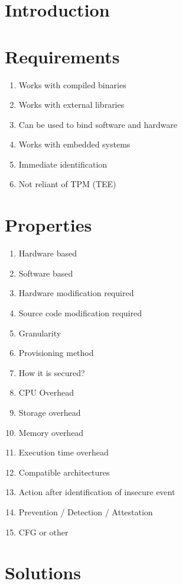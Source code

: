 \section{Introduction}\label{requirementsIntro}


\section{Requirements}\label{Requirements}

\begin{enumerate}
	\item Works with compiled binaries
	\item Works with external libraries
	\item Can be used to bind software and hardware
	\item Works with embedded systems
	\item Immediate identification
	\item Not reliant of TPM (TEE)
\end{enumerate}

\section{Properties}\label{Properties}

\begin{enumerate}
	\item Hardware based
	\item Software based
	\item Hardware modification required
	\item Source code modification required
	\item Granularity
	\item Provisioning method
	\item How it is secured?
	\item CPU Overhead
	\item Storage overhead
	\item Memory overhead
	\item Execution time overhead
	\item Compatible architectures
	\item Action after identification of insecure event
	\item Prevention / Detection / Attestation
	\item CFG or other
\end{enumerate}

\section{Solutions}\label{Solutions}

